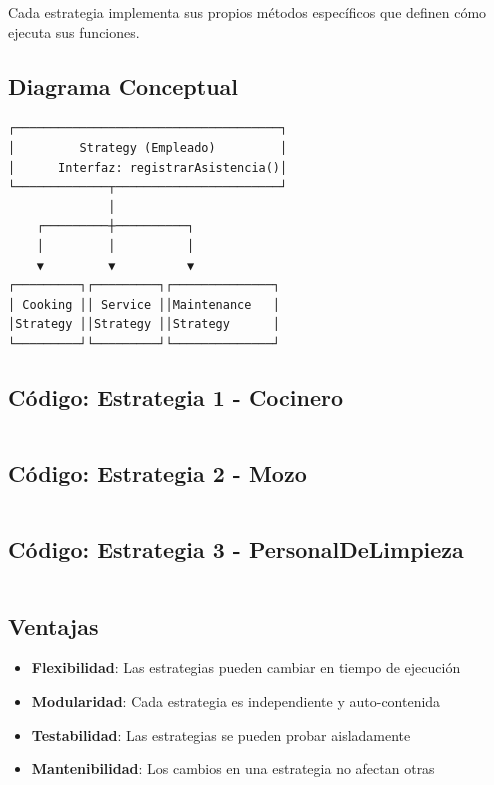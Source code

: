 \documentclass[12pt, a4paper]{report}
\begin{document}
Cada estrategia implementa sus propios métodos específicos que definen cómo ejecuta sus funciones.

\subsection{Diagrama Conceptual}

\begin{verbatim}
┌─────────────────────────────────────┐
│         Strategy (Empleado)         │
│      Interfaz: registrarAsistencia()│
└─────────────┬───────────────────────┘
              │
    ┌─────────┼──────────┐
    │         │          │
    ▼         ▼          ▼
┌─────────┐┌─────────┐┌──────────────┐
│ Cooking ││ Service ││Maintenance   │
│Strategy ││Strategy ││Strategy      │
└─────────┘└─────────┘└──────────────┘
\end{verbatim}

\subsection{Código: Estrategia 1 - Cocinero}

\inputminted[firstline=1, lastline=22]{java}{../../src/main/java/com/wallpawawqi/Class/Subclases/Cocinero.java}

\subsection{Código: Estrategia 2 - Mozo}

\inputminted[firstline=1, lastline=26]{java}{../../src/main/java/com/wallpawawqi/Class/Subclases/Mozo.java}

\subsection{Código: Estrategia 3 - PersonalDeLimpieza}

\inputminted[firstline=1, lastline=19]{java}{../../src/main/java/com/wallpawawqi/Class/Subclases/PersonalDeLimpieza.java}

\subsection{Ventajas}

\begin{itemize}
    \item \textbf{Flexibilidad}: Las estrategias pueden cambiar en tiempo de ejecución
    \item \textbf{Modularidad}: Cada estrategia es independiente y auto-contenida
    \item \textbf{Testabilidad}: Las estrategias se pueden probar aisladamente
    \item \textbf{Mantenibilidad}: Los cambios en una estrategia no afectan otras
\end{itemize}
\end{document}
